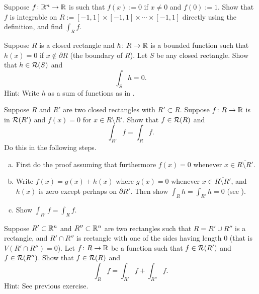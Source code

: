 \begin{exercise}
Suppose $f\colon {\mathbb{R}}^n \to {\mathbb{R}}$ is such that
$f(x) := 0$ if $x\not= 0$ and $f(0) := 1$.  Show that $f$ is integrable
on $R := [-1,1] \times [-1,1] \times \cdots \times [-1,1]$ directly using the
definition, and find $\int_R f$.
\end{exercise}

\begin{exercise} \label{mv:zeroinside}
Suppose $R$ is a closed rectangle and $h \colon R \to {\mathbb{R}}$ is a bounded function
such that $h(x) = 0$ if $x \notin \partial R$ (the boundary of $R$).
Let $S$ be any closed rectangle.
Show that $h \in {\mathcal{R}}(S)$ and
\begin{equation*}
\int_{S} h = 0 .
\end{equation*}
Hint: Write $h$ as a sum of functions as in .
\end{exercise}

\begin{exercise} \label{mv:zerooutside}
Suppose $R$ and $R'$ are two closed rectangles with $R' \subset R$.  Suppose $f \colon R \to {\mathbb{R}}$ is in ${\mathcal{R}}(R')$
and $f(x) = 0$ for $x \in R \setminus R'$.
Show that $f \in {\mathcal{R}}(R)$ and
\begin{equation*}
\int_{R'} f = \int_R f .
\end{equation*}
Do this in the following steps.
\begin{enumerate}[a)]
\item
First do the proof assuming that furthermore $f(x) = 0$ whenever $x
\in \overline{R \setminus R'}$.
\item
Write $f(x) = g(x) + h(x)$ where $g(x) = 0$ whenever $x
\in \overline{R \setminus R'}$, and $h(x)$ is zero except perhaps on
$\partial R'$.
Then show $\int_R h = \int_{R'} h = 0$ (see ).
\item
Show 
$\int_{R'} f = \int_R f$.
\end{enumerate}
\end{exercise}

\begin{exercise}
Suppose $R' \subset {\mathbb{R}}^n$ and $R'' \subset {\mathbb{R}}^n$ are two rectangles
such that $R = R' \cup R''$ is a rectangle, and $R' \cap R''$ is rectangle
with one of the sides having length 0 (that is $V(R' \cap R'') = 0$).
Let $f \colon R \to {\mathbb{R}}$ be a function such that $f \in {\mathcal{R}}(R')$ and
$f \in {\mathcal{R}}(R'')$.  Show that $f \in {\mathcal{R}}(R)$ and
\begin{equation*}
\int_{R} f = \int_{R'} f + \int_{R''} f .
\end{equation*}
Hint: See previous exercise.
\end{exercise}

